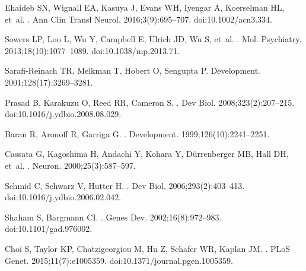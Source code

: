 \documentclass[10pt,letterpaper]{article}
\begin{document}
{\begin{thebibliography}{100}
Ehaideb SN, Wignall EA, Kasuya J, Evans WH, Iyengar A, Koerselman HL, et~al.
.
\newblock Ann Clin Transl Neurol. 2016;3(9):695--707.
\newblock doi:{10.1002/acn3.334}.

Sowers LP, Loo L, Wu Y, Campbell E, Ulrich JD, Wu S, et~al.
.
\newblock Mol. Psychiatry. 2013;18(10):1077--1089.
\newblock doi:{10.1038/mp.2013.71}.

Sarafi-Reinach TR, Melkman T, Hobert O, Sengupta P.
\newblock Development. 2001;128(17):3269--3281.

Prasad B, Karakuzu O, Reed RR, Cameron S.
.
\newblock Dev Biol. 2008;323(2):207--215.
\newblock doi:{10.1016/j.ydbio.2008.08.029}.

Baran R, Aronoff R, Garriga G.
.
\newblock Development. 1999;126(10):2241--2251.

Cassata G, Kagoshima H, Andachi Y, Kohara Y, D{\"{u}}rrenberger MB, Hall DH,
  et~al.
.
\newblock Neuron. 2000;25(3):587--597.

Schmid C, Schwarz V, Hutter H.
.
\newblock Dev Biol. 2006;293(2):403--413.
\newblock doi:{10.1016/j.ydbio.2006.02.042}.

Shaham S, Bargmann CI.
.
\newblock Genes Dev. 2002;16(8):972--983.
\newblock doi:{10.1101/gad.976002}.

Choi S, Taylor KP, Chatzigeorgiou M, Hu Z, Schafer WR, Kaplan JM.
.
\newblock PLoS Genet. 2015;11(7):e1005359.
\newblock doi:{10.1371/journal.pgen.1005359}.


\end{thebibliography}}
\end{document}
